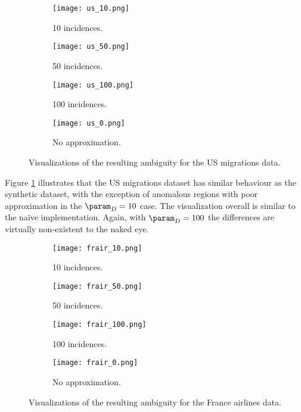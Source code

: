 \begin{figure}[H]
    \centering
    \begin{subfigure}[b]{0.45\linewidth}
        \texttt{[image: us\_10.png]}
        \caption{10 incidences.}
    \end{subfigure}
    \begin{subfigure}[b]{0.45\linewidth}
        \texttt{[image: us\_50.png]}
        \caption{50 incidences.}
    \end{subfigure}
    \begin{subfigure}[b]{0.45\linewidth}
        \texttt{[image: us\_100.png]}
        \caption{100 incidences.}
    \end{subfigure}
    \begin{subfigure}[b]{0.45\linewidth}
        \texttt{[image: us\_0.png]}
        \caption{No approximation.}
    \end{subfigure}
    \caption{Visualizations of the resulting ambiguity for the US migrations data.}
    \label{fig:test2}
\end{figure}

Figure \ref{fig:test2} illustrates that the US migrations dataset has similar behaviour as the synthetic dataset, with the exception of anomalous regions with poor approximation in the $\param_D = 10$ case. The visualization overall is similar to the na\"ive implementation. Again, with $\param_D = 100$ the differences are virtually non-existent to the naked eye.

\newpage

\begin{figure}[H]
    \centering
    \begin{subfigure}[b]{0.45\linewidth}
        \texttt{[image: frair\_10.png]}
        \caption{10 incidences.}
    \end{subfigure}
    \begin{subfigure}[b]{0.45\linewidth}
        \texttt{[image: frair\_50.png]}
        \caption{50 incidences.}
    \end{subfigure}
    \begin{subfigure}[b]{0.45\linewidth}
        \texttt{[image: frair\_100.png]}
        \caption{100 incidences.}
    \end{subfigure}
    \begin{subfigure}[b]{0.45\linewidth}
        \texttt{[image: frair\_0.png]}
        \caption{No approximation.}
    \end{subfigure}
    \caption{Visualizations of the resulting ambiguity for the France airlines data.}
    \label{fig:test3}
\end{figure}

